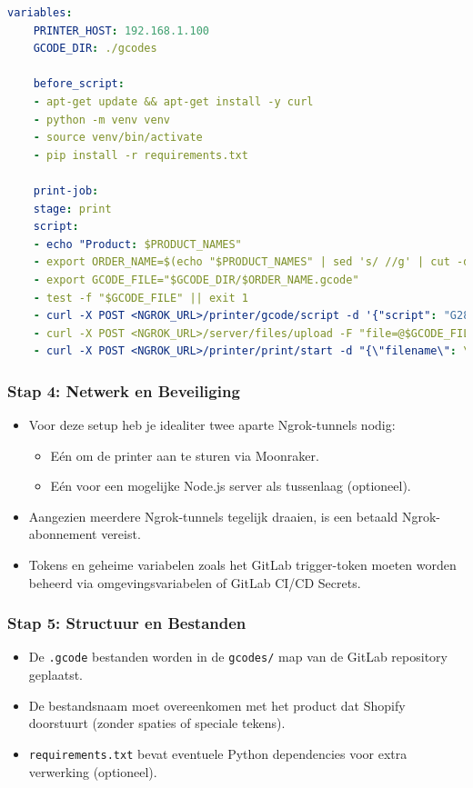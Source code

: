 \begin{enumerate}
\begin{lstlisting}[language=yaml, caption=.gitlab-ci.yml structuur (vereenvoudigd)]
    variables:
    PRINTER_HOST: 192.168.1.100
    GCODE_DIR: ./gcodes
    
    before_script:
    - apt-get update && apt-get install -y curl
    - python -m venv venv
    - source venv/bin/activate
    - pip install -r requirements.txt
    
    print-job:
    stage: print
    script:
    - echo "Product: $PRODUCT_NAMES"
    - export ORDER_NAME=$(echo "$PRODUCT_NAMES" | sed 's/ //g' | cut -d',' -f1)
    - export GCODE_FILE="$GCODE_DIR/$ORDER_NAME.gcode"
    - test -f "$GCODE_FILE" || exit 1
    - curl -X POST <NGROK_URL>/printer/gcode/script -d '{"script": "G28"}'
    - curl -X POST <NGROK_URL>/server/files/upload -F "file=@$GCODE_FILE"
    - curl -X POST <NGROK_URL>/printer/print/start -d "{\"filename\": \"$ORDER_NAME.gcode\"}"
\end{lstlisting}

\subsubsection{Stap 4: Netwerk en Beveiliging}
\begin{itemize}
    \item Voor deze setup heb je idealiter twee aparte Ngrok-tunnels nodig:
    \begin{itemize}
        \item Eén om de printer aan te sturen via Moonraker.
        \item Eén voor een mogelijke Node.js server als tussenlaag (optioneel).
    \end{itemize}
    \item Aangezien meerdere Ngrok-tunnels tegelijk draaien, is een betaald Ngrok-abonnement vereist.
    \item Tokens en geheime variabelen zoals het GitLab trigger-token moeten worden beheerd via omgevingsvariabelen of GitLab CI/CD Secrets.
\end{itemize}

\subsubsection{Stap 5: Structuur en Bestanden}
\begin{itemize}
    \item De \texttt{.gcode} bestanden worden in de \texttt{gcodes/} map van de GitLab repository geplaatst.
    \item De bestandsnaam moet overeenkomen met het product dat Shopify doorstuurt (zonder spaties of speciale tekens).
    \item \texttt{requirements.txt} bevat eventuele Python dependencies voor extra verwerking (optioneel).
\end{itemize}


\end{enumerate}
